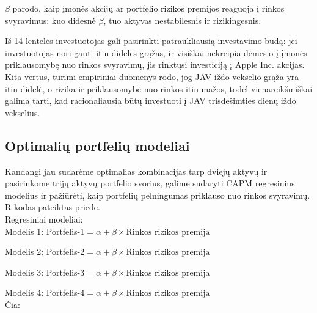 \documentclass[12pt, a14paper, lithuanian]{article}
\begin{document}
$\beta$ parodo, kaip įmonės akcijų ar portfelio rizikos premijos reaguoja į rinkos svyravimus:  kuo didesnė $\beta$, tuo aktyvas nestabilesnis ir rizikingesnis. \\


\begin{comment}
\begin{figure}[H]
  \centering
\texttt{[image: kursinis-022]}

\caption{Rinkos, iždo vekselių ir įmonių $\beta$ ir ją atitinkantis grąžų vidurkis}
\end{figure}

\end{comment}

Iš 14 lentelės investuotojas gali pasirinkti patraukliausią investavimo būdą: jei investuotojas nori gauti itin dideles grąžas, ir visiškai nekreipia dėmesio į įmonės priklausomybę nuo rinkos svyravimų, jis rinktųsi investiciją į Apple Inc. akcijas. Kita vertus, turimi empiriniai duomenys rodo, jog JAV iždo vekselio grąža yra itin didelė, o rizika ir priklausomybė nuo rinkos itin mažos, todėl vienareikšmiškai galima tarti, kad racionaliausia būtų investuoti į JAV trisdešimties dienų iždo vekselius.

\pagebreak

\subsection{Optimalių portfelių modeliai}

Kandangi jau sudarėme optimalias kombinacijas tarp dviejų aktyvų ir
pasirinkome trijų aktyvų portfelio svorius, galime sudaryti CAPM regresinius modelius ir pažiūrėti, kaip portfelių pelningumas priklauso nuo rinkos svyravimų. R kodas pateiktas priede. \\

Regresiniai modeliai: \\

Modelis 1: Portfelis-1$= \alpha + \beta \times \text{Rinkos rizikos premija}$

Modelis 2: Portfelis-2$= \alpha + \beta \times \text{Rinkos rizikos premija}$

Modelis 3: Portfelis-3$= \alpha + \beta \times \text{Rinkos rizikos premija}$

Modelis 4: Portfelis-4$= \alpha + \beta \times \text{Rinkos rizikos premija}$ \\

Čia:\\
\end{document}
